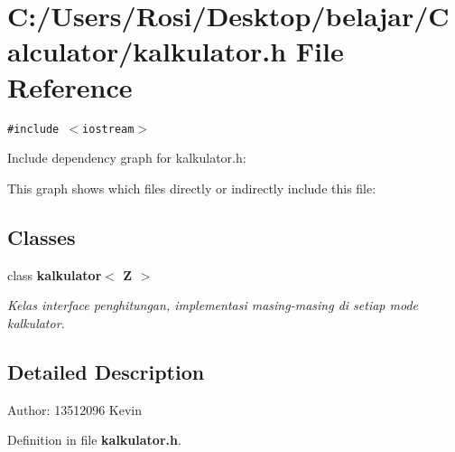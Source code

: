 \section{C:/Users/Rosi/Desktop/belajar/Calculator/kalkulator.h File Reference}
\label{kalkulator_8h}
{\tt \#include $<$iostream$>$}\par


Include dependency graph for kalkulator.h:

This graph shows which files directly or indirectly include this file:\subsection*{Classes}
\begin{CompactItemize}
\item 
class {\bf kalkulator$<$ Z $>$}
\begin{CompactList}\small\item\em Kelas interface penghitungan, implementasi masing-masing di setiap mode kalkulator. \item\end{CompactList}\end{CompactItemize}


\subsection{Detailed Description}
\begin{Desc}
\item[Author:]13512096 Kevin \end{Desc}


Definition in file {\bf kalkulator.h}.